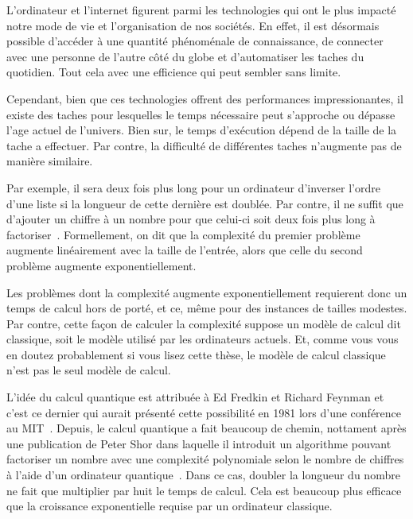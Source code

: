 \begin{comment}
\end{comment}

\Introduction   %

L'ordinateur et l'internet figurent parmi les technologies qui ont le plus impacté
notre mode de vie et l'organisation de nos sociétés.
En effet,
il est désormais possible d'accéder à une quantité phénoménale de connaissance,
de connecter avec une personne de l'autre côté du globe
et d'automatiser les taches du quotidien.
Tout cela avec une efficience qui peut sembler sans limite.

Cependant, 
bien que ces technologies offrent des performances impressionantes,
il existe des taches pour lesquelles le temps nécessaire peut s'approche ou
dépasse l'age actuel de l'univers.
Bien sur,
le temps d'exécution dépend de la taille de la tache a effectuer.
Par contre, 
la difficulté de différentes taches n'augmente pas de manière similaire.

Par exemple,
il sera deux fois plus long pour un ordinateur d'inverser l'ordre d'une liste 
si la longueur de cette dernière est doublée.
Par contre,
il ne suffit que d'ajouter un chiffre à un nombre pour que celui-ci soit deux 
fois plus long à factoriser~\cite{arora_computational_2009}.
Formellement,
on dit que la complexité du premier problème augmente linéairement avec la taille de l'entrée,
alors que celle du second problème augmente exponentiellement.

Les problèmes dont la complexité augmente exponentiellement requierent donc un temps de calcul
hors de porté, et ce, même pour des instances de tailles modestes.
Par contre,
cette façon de calculer la complexité suppose un modèle de calcul dit classique,
soit le modèle utilisé par les ordinateurs actuels.
Et,
comme vous vous en doutez probablement si vous lisez cette thèse,
le modèle de calcul classique n'est pas le seul modèle de calcul.

L'idée du calcul quantique est attribuée à Ed Fredkin et Richard Feynman et 
c'est ce dernier qui aurait présenté cette possibilité en 1981 lors d'une conférence au MIT~\cite{hoofnagle_birth_2021}.
Depuis,
le calcul quantique a fait beaucoup de chemin,
nottament après une publication de Peter Shor dans laquelle il introduit un 
algorithme pouvant factoriser un nombre avec une complexité polynomiale selon
le nombre de chiffres à l'aide d'un ordinateur quantique~\cite{shor_algorithms_1994}.
Dans ce cas,
doubler la longueur du nombre ne fait que multiplier par huit le temps de calcul.
Cela est beaucoup plus efficace que la croissance exponentielle requise par un ordinateur classique.

